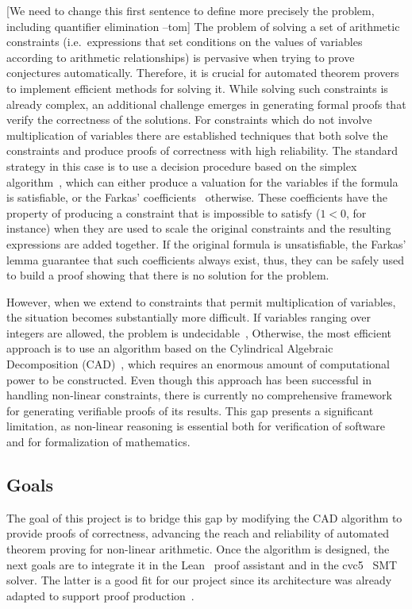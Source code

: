 \documentclass[a4paper, 12pt]{article}
\newcommand{\yell}[1]{{\color{blue} [#1]}}
\newcommand{\tom}[1]{\yell{#1 --tom}}
\begin{document}
\tom{We need to change this first sentence to define more precisely the problem, including quantifier elimination}
The problem of solving a set of arithmetic constraints (i.e.\ expressions that set conditions
on the values of variables according to arithmetic relationships) is pervasive when trying to
prove conjectures automatically. Therefore, it is crucial for automated theorem provers to
implement efficient methods for solving it.
%
While solving such constraints is already complex, an additional challenge emerges in generating
formal proofs that verify the correctness of the solutions.
%
For constraints which do not involve multiplication of variables there are established techniques
that both solve the constraints and produce proofs of correctness with high reliability.
%
The standard strategy in this case is to use a decision procedure based on the simplex algorithm~\cite{simplex_dpllt}, which can either produce a valuation for the variables if the formula
is satisfiable, or the Farkas' coefficients~\cite{farkas_ref} otherwise.
%
These coefficients have the property of producing a constraint that is impossible to satisfy
($1 < 0$, for instance) when they are used to scale the original constraints and the resulting
expressions are added together.
%
If the original formula is unsatisfiable, the Farkas' lemma guarantee that such coefficients always
exist, thus, they can be safely used to build a proof showing that there is no solution for the problem.

However, when we extend to constraints that permit multiplication of variables,
the situation becomes substantially more difficult.
If variables ranging over integers are allowed, the problem is undecidable~\cite{integerUndec},
Otherwise, the most efficient approach is to use an algorithm based on the Cylindrical
Algebraic Decomposition (CAD)~\cite{col75},
which requires an enormous amount of computational power to be constructed. Even though
this approach has been successful in handling non-linear constraints, there is currently
no comprehensive framework for generating verifiable proofs of its results. This gap presents
a significant limitation, as non-linear reasoning is essential both for verification of
software and for formalization of mathematics.

\subsection{Goals}

The goal of this project is to bridge this gap by modifying the CAD algorithm to provide
proofs of correctness, advancing the reach and reliability of automated theorem proving
for non-linear arithmetic. Once the algorithm is designed, the next goals
are to integrate it in the Lean~\cite{lean4} proof assistant and in the cvc5~\cite{cvc5} SMT solver.
The latter is a good fit for our project since its architecture was already adapted to support proof production~\cite{flexibleProofs}.
\end{document}
